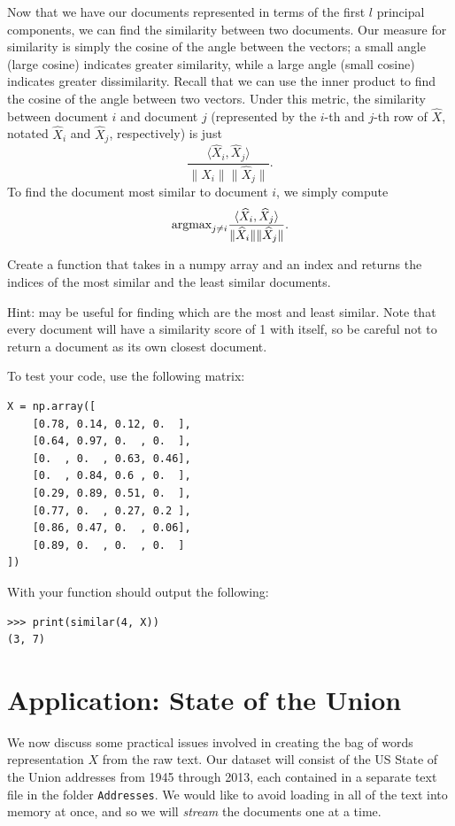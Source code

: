 Now that we have our documents represented in terms of the first $l$ principal components, we can find the similarity between two documents.
Our measure for similarity is simply the cosine of the angle between the vectors; a small angle (large cosine) indicates greater similarity, while a large angle (small cosine) indicates greater dissimilarity.
Recall that we can use the inner product to find the cosine of the angle between two vectors.
Under this metric, the similarity between document $i$ and document $j$ (represented by the $i$-th and $j$-th row of $\widehat{X}$, notated $\widehat{X}_i$ and $\widehat{X}_j$, respectively) is just
\[
\frac{\langle \widehat{X}_i, \widehat{X}_j\rangle}{\|\widehat{X}_i\|\|\widehat{X}_j\|}.
\]
To find the document most similar to document $i$, we simply compute
\[
\mbox{argmax}_{j\neq i} \frac{\langle \widehat{X}_i, \widehat{X}_j\rangle}{\|\widehat{X}_i\|\|\widehat{X}_j\|}.
\]

\begin{problem} %
Create a function  that takes in a numpy array  and an index  and returns the indices of the most similar and the least similar documents.

Hint:  may be useful for finding which are the most and least similar.
Note that every document will have a similarity score of 1 with itself, so be careful not to return a document as its own closest document.

To test your code, use the following matrix:
\begin{lstlisting}
X = np.array([
    [0.78, 0.14, 0.12, 0.  ],
    [0.64, 0.97, 0.  , 0.  ],
    [0.  , 0.  , 0.63, 0.46],
    [0.  , 0.84, 0.6 , 0.  ],
    [0.29, 0.89, 0.51, 0.  ],
    [0.77, 0.  , 0.27, 0.2 ],
    [0.86, 0.47, 0.  , 0.06],
    [0.89, 0.  , 0.  , 0.  ]
])
\end{lstlisting}
With  your function should output the following:
\begin{lstlisting}
>>> print(similar(4, X))
(3, 7)
\end{lstlisting}
\end{problem}

\section*{Application: State of the Union}
We now discuss some practical issues involved in creating the bag of words representation $X$ from the raw text.
Our dataset will consist of the US State of the Union addresses from 1945 through 2013, each contained in a separate text file in the folder {\tt Addresses}.
We would like to avoid loading in all of the text into memory at once, and so we will \emph{stream} the documents one at a time.

